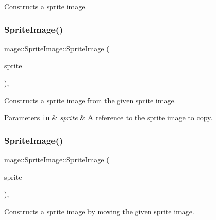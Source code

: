 Constructs a sprite image. \hypertarget{classmage_1_1_sprite_image_a707cc96ae9b15fd85ce0c70d1eed458d}{}\label{classmage_1_1_sprite_image_a707cc96ae9b15fd85ce0c70d1eed458d} 
\subsubsection{\texorpdfstring{Sprite\+Image()}{SpriteImage()}\hspace{0.1cm}{\footnotesize\ttfamily [2/3]}}
{\footnotesize\ttfamily mage\+::\+Sprite\+Image\+::\+Sprite\+Image (\begin{DoxyParamCaption}\item[{const \hyperlink{classmage_1_1_sprite_image}{Sprite\+Image} \&}]{sprite }\end{DoxyParamCaption})\hspace{0.3cm}{\ttfamily [default]}, {\ttfamily [noexcept]}}

Constructs a sprite image from the given sprite image.


\begin{DoxyParams}[1]{Parameters}
\mbox{\tt in}  & {\em sprite} & A reference to the sprite image to copy. \\
\hline
\end{DoxyParams}
\hypertarget{classmage_1_1_sprite_image_aedd0892075000cb3217550d1a924f926}{}\label{classmage_1_1_sprite_image_aedd0892075000cb3217550d1a924f926} 
\subsubsection{\texorpdfstring{Sprite\+Image()}{SpriteImage()}\hspace{0.1cm}{\footnotesize\ttfamily [3/3]}}
{\footnotesize\ttfamily mage\+::\+Sprite\+Image\+::\+Sprite\+Image (\begin{DoxyParamCaption}\item[{\hyperlink{classmage_1_1_sprite_image}{Sprite\+Image} \&\&}]{sprite }\end{DoxyParamCaption})\hspace{0.3cm}{\ttfamily [default]}, {\ttfamily [noexcept]}}

Constructs a sprite image by moving the given sprite image.


